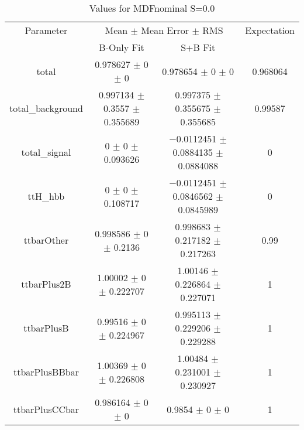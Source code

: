 \begin{table}
\centering
\caption{Values for MDFnominal S=0.0}
\begin{tabular}{cccc}
\toprule
Parameter & \multicolumn{2}{c}{Mean $\pm$ Mean Error $\pm$ RMS} & Expectation\\
 & B-Only Fit & S+B Fit & \\
\midrule
total & \num{0.978627} $\pm$ \num{0} $\pm$ \num{0} & \num{0.978654} $\pm$ \num{0} $\pm$ \num{0} & \num{0.968064}\\
total\_background & \num{0.997134} $\pm$ \num{0.3557} $\pm$ \num{0.355689} & \num{0.997375} $\pm$ \num{0.355675} $\pm$ \num{0.355685} & \num{0.99587}\\
total\_signal & \num{0} $\pm$ \num{0} $\pm$ \num{0.093626} & \num{-0.0112451} $\pm$ \num{0.0884135} $\pm$ \num{0.0884088} & \num{0}\\
ttH\_hbb & \num{0} $\pm$ \num{0} $\pm$ \num{0.108717} & \num{-0.0112451} $\pm$ \num{0.0846562} $\pm$ \num{0.0845989} & \num{0}\\
ttbarOther & \num{0.998586} $\pm$ \num{0} $\pm$ \num{0.2136} & \num{0.998683} $\pm$ \num{0.217182} $\pm$ \num{0.217263} & \num{0.99}\\
ttbarPlus2B & \num{1.00002} $\pm$ \num{0} $\pm$ \num{0.222707} & \num{1.00146} $\pm$ \num{0.226864} $\pm$ \num{0.227071} & \num{1}\\
ttbarPlusB & \num{0.99516} $\pm$ \num{0} $\pm$ \num{0.224967} & \num{0.995113} $\pm$ \num{0.229206} $\pm$ \num{0.229288} & \num{1}\\
ttbarPlusBBbar & \num{1.00369} $\pm$ \num{0} $\pm$ \num{0.226808} & \num{1.00484} $\pm$ \num{0.231001} $\pm$ \num{0.230927} & \num{1}\\
ttbarPlusCCbar & \num{0.986164} $\pm$ \num{0} $\pm$ \num{0} & \num{0.9854} $\pm$ \num{0} $\pm$ \num{0} & \num{1}\\
\bottomrule
\end{tabular}
\end{table}